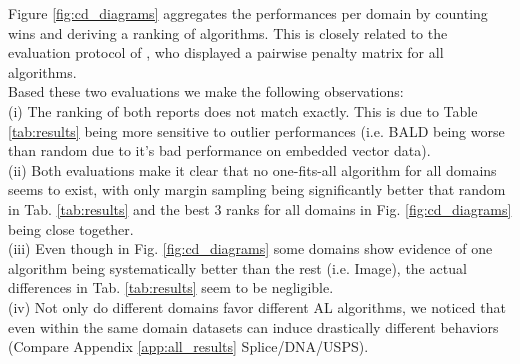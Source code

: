 \documentclass[]{article}
\begin{document}
Figure \ref{fig:cd_diagrams} aggregates the performances per domain by counting wins and deriving a ranking of algorithms.
This is closely related to the evaluation protocol of \cite{ashdeep}, who displayed a pairwise penalty matrix for all algorithms. \\
Based these two evaluations we make the following observations:\\
(i) The ranking of both reports does not match exactly.
This is due to Table \ref{tab:results} being more sensitive to outlier performances (i.e. BALD being worse than random due to it's bad performance on embedded vector data). \\
(ii) Both evaluations make it clear that no one-fits-all algorithm for all domains seems to exist, with only margin sampling being significantly better that random in Tab. \ref{tab:results} and the best 3 ranks for all domains in Fig. \ref{fig:cd_diagrams} being close together. \\
(iii) Even though in Fig. \ref{fig:cd_diagrams} some domains show evidence of one algorithm being systematically better than the rest (i.e. Image), the actual differences in Tab. \ref{tab:results} seem to be negligible. \\
(iv) Not only do different domains favor different AL algorithms, we noticed that even within the same domain datasets can induce drastically different behaviors (Compare Appendix \ref{app:all_results} Splice/DNA/USPS). 

\end{document}
